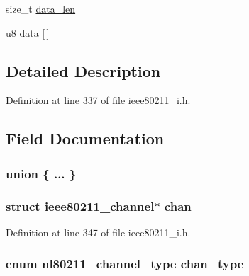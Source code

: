 \begin{DoxyCompactItemize}
\begin{tabbing}
\end{tabbing}\item 
size\-\_\-t \hyperlink{structieee80211__work_ace1c2e33b74df8973a7d9a19c935af80}{data\-\_\-len}
\item 
u8 \hyperlink{structieee80211__work_a6dc95797421616e7833cb107fee9d17f}{data} \mbox{[}$\,$\mbox{]}
\end{DoxyCompactItemize}


\subsection{Detailed Description}


Definition at line 337 of file ieee80211\-\_\-i.\-h.



\subsection{Field Documentation}
\hypertarget{structieee80211__work_a4b97c6d84b14925ea9f396a098ca6421}{\subsubsection[{"@3}]{\setlength{\rightskip}{0pt plus 5cm}union \{ ... \} }}\label{structieee80211__work_a4b97c6d84b14925ea9f396a098ca6421}
\hypertarget{structieee80211__work_ad695b849e189aedbc929a30c616fbfc7}{
\subsubsection[{chan}]{\setlength{\rightskip}{0pt plus 5cm}struct ieee80211\-\_\-channel$\ast$ chan}}\label{structieee80211__work_ad695b849e189aedbc929a30c616fbfc7}


Definition at line 347 of file ieee80211\-\_\-i.\-h.

\hypertarget{structieee80211__work_a82a2bcb2ebd1e6187c8057f98ce6bd3f}{
\subsubsection[{chan\-\_\-type}]{\setlength{\rightskip}{0pt plus 5cm}enum nl80211\-\_\-channel\-\_\-type chan\-\_\-type}}\label{structieee80211__work_a82a2bcb2ebd1e6187c8057f98ce6bd3f}


